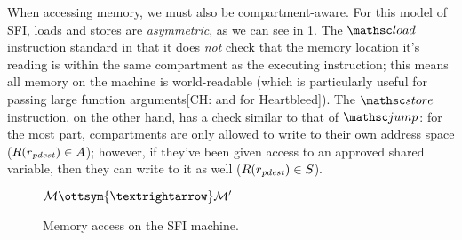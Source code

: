 \documentclass[12pt]{amsart}
\newif\ifdraft\drafttrue
\newcommand{\comm}[3]{\ifdraft\textcolor{#1}{[#2: #3]}\fi}
\newcommand{\ch}[1]{\comm{dkgreen}{CH}{#1}} %
\begin{document}
When accessing memory, we must also be compartment-aware.  For this model of
SFI, loads and stores are \emph{asymmetric}, as we can see in
\cref{fig:sfi-step-memory}.  The $\opcode{load}$ instruction standard in that it
does \emph{not} check that the memory location it's reading is within the same
compartment as the executing instruction; this means all memory on the machine
is world-readable (which is particularly useful for passing large function
arguments\ch{ and for Heartbleed}).
The $\opcode{store}$ instruction, on the other hand, has a check
similar to that of $\opcode{jump}$: for the most part, compartments are only
allowed to write to their own address space ($R(r_{\mathit{pdest}}) \in
A$); however, if they've been given access to an approved shared
variable, then they can write to it as well ($R(r_{\mathit{pdest}}) \in
S$).

\begin{figure}
  \begin{ottdefnblock}{$\mathcal{M} \ottsym{→} \mathcal{M}'$}
                      {}
    \ottusedrule{\ottdrulestepXXload{}}\medskip
    \ottusedrule{\ottdrulestepXXstore{}}
  \end{ottdefnblock}\vspace{-\baselineskip}
  \caption{Memory access on the SFI machine.}
  \label{fig:sfi-step-memory}
\end{figure}
\end{document}
